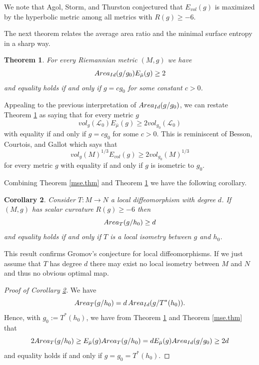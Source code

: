\documentclass[11pt]{amsart}
\newtheorem{thm}{Theorem}[section]
\newtheorem{cor}[thm]{Corollary}
\theoremstyle{remark}
\theoremstyle{definition}
\begin{document}
{	
	
	We  note that Agol, Storm, and Thurston \cite{agol-storm-thurston} conjectured that $E_{vol}(g)$ is maximized by the hyperbolic metric among all metrics with $R(g)\geq -6$. 
	
	
	
	The next theorem relates the average area ratio and the minimal surface entropy in a sharp way.
	
	\begin{thm}\label{rel.thm} For every Riemannian metric  $(M,g)$  we have $${\rm Area}_{{\rm Id}}(g/g_0) {E_{\bar\mu}(g)}\geq 2$$ and  equality holds if and only if $g=cg_0$ for some constant $c>0$.
	\end{thm}
	Appealing to the previous interpretation of ${\rm Area}_{{\rm Id}}(g/g_0)$, we can restate Theorem \ref{rel.thm} as  saying that for every metric $g$
	$$vol_{g}(\mathcal L_0) E_{\bar\mu}(g)\geq 2 vol_{g_0}(\mathcal L_0) $$
	with equality if and only if  $g=cg_0$ for some $c>0$.
	This is reminiscent of Besson, Courtois, and Gallot \cite{BCG} which says that 
	$$vol_g(M)^{1/3}E_{vol}(g)\geq 2vol_{g_0}(M)^{1/3}$$
	for every metric $g$ with equality if and only if $g$ is isometric to $g_0$.   %
	
	
	Combining Theorem \ref{mse.thm} and Theorem \ref{rel.thm} we have the following corollary.
	\begin{cor}\label{aar.thm} Consider $T:M\rightarrow N$ a local diffeomorphism with degree $d$. If $(M,g)$ has scalar curvature $R(g)\geq -6$ then
		$${\rm Area}_T(g/h_0)\geq d$$
		{and equality holds if and only if $T$ is a local isometry between $g$ and $h_0$.}
	\end{cor}
	This result confirms Gromov's conjecture for local diffeomorphisms. If we just assume that $T$ has degree $d$ there may exist no local isometry between $M$ and $N$ and thus no obvious optimal map. 
	\begin{proof}[Proof of Corollary \ref{aar.thm}]
		We have 
		$${\rm Area}_{T}(g/h_0)=d\,{\rm Area}_{{\rm Id}}(g/T^*(h_0)).$$
		Hence, with $g_0:=T^*(h_0)$, we have from Theorem \ref{rel.thm} and Theorem \ref{mse.thm} that
		$$2{\rm Area}_{T}(g/h_0)\geq {E_{\bar\mu}(g)}{\rm Area}_{T}(g/h_0)=d {E_{\bar\mu}(g)}{\rm Area}_{{\rm Id}}(g/g_0)\geq 2d$$
		and equality holds if and only if $g=g_0=T^*(h_0)$.
	\end{proof}
	
}
\end{document}
